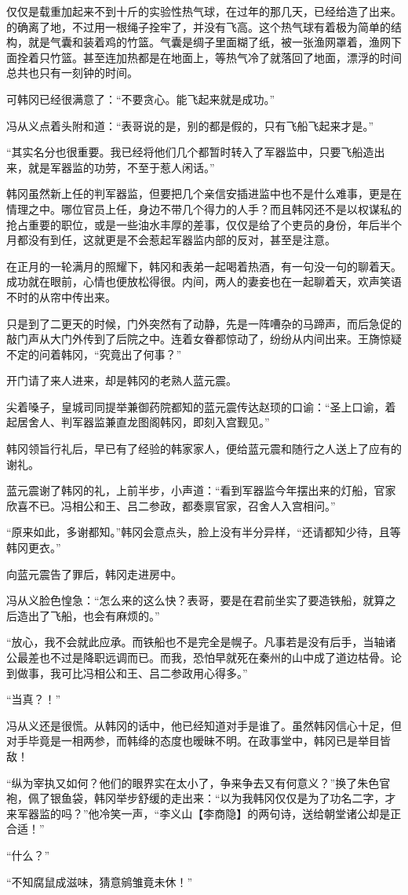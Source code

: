 仅仅是载重加起来不到十斤的实验性热气球，在过年的那几天，已经给造了出来。的确离了地，不过用一根绳子拴牢了，并没有飞高。这个热气球有着极为简单的结构，就是气囊和装着鸡的竹篮。气囊是绸子里面糊了纸，被一张渔网罩着，渔网下面拴着只竹篮。甚至连加热都是在地面上，等热气冷了就落回了地面，漂浮的时间总共也只有一刻钟的时间。

可韩冈已经很满意了：“不要贪心。能飞起来就是成功。”

冯从义点着头附和道：“表哥说的是，别的都是假的，只有飞船飞起来才是。”

“其实名分也很重要。我已经将他们几个都暂时转入了军器监中，只要飞船造出来，就是军器监的功劳，不至于惹人闲话。”

韩冈虽然新上任的判军器监，但要把几个亲信安插进监中也不是什么难事，更是在情理之中。哪位官员上任，身边不带几个得力的人手？而且韩冈还不是以权谋私的抢占重要的职位，或是一些油水丰厚的差事，仅仅是给了个吏员的身份，年后半个月都没有到任，这就更是不会惹起军器监内部的反对，甚至是注意。

在正月的一轮满月的照耀下，韩冈和表弟一起喝着热酒，有一句没一句的聊着天。成功就在眼前，心情也便放松得很。内间，两人的妻妾也在一起聊着天，欢声笑语不时的从帘中传出来。

只是到了二更天的时候，门外突然有了动静，先是一阵嘈杂的马蹄声，而后急促的敲门声从大门外传到了后院之中。连着女眷都惊动了，纷纷从内间出来。王旖惊疑不定的问着韩冈，“究竟出了何事？”

开门请了来人进来，却是韩冈的老熟人蓝元震。

尖着嗓子，皇城司同提举兼御药院都知的蓝元震传达赵顼的口谕：“圣上口谕，着起居舍人、判军器监兼直龙图阁韩冈，即刻入宫觐见。”

韩冈领旨行礼后，早已有了经验的韩家家人，便给蓝元震和随行之人送上了应有的谢礼。

蓝元震谢了韩冈的礼，上前半步，小声道：“看到军器监今年摆出来的灯船，官家欣喜不已。冯相公和王、吕二参政，都奏禀官家，召舍人入宫相问。”

“原来如此，多谢都知。”韩冈会意点头，脸上没有半分异样，“还请都知少待，且等韩冈更衣。”

向蓝元震告了罪后，韩冈走进房中。

冯从义脸色惶急：“怎么来的这么快？表哥，要是在君前坐实了要造铁船，就算之后造出了飞船，也会有麻烦的。”

“放心，我不会就此应承。而铁船也不是完全是幌子。凡事若是没有后手，当轴诸公最差也不过是降职远调而已。而我，恐怕早就死在秦州的山中成了道边枯骨。论到做事，我可比冯相公和王、吕二参政用心得多。”

“当真？！”

冯从义还是很慌。从韩冈的话中，他已经知道对手是谁了。虽然韩冈信心十足，但对手毕竟是一相两参，而韩绛的态度也暧昧不明。在政事堂中，韩冈已是举目皆敌！

“纵为宰执又如何？他们的眼界实在太小了，争来争去又有何意义？”换了朱色官袍，佩了银鱼袋，韩冈举步舒缓的走出来：“以为我韩冈仅仅是为了功名二字，才来军器监的吗？”他冷笑一声，“李义山【李商隐】的两句诗，送给朝堂诸公却是正合适！”

“什么？”

“不知腐鼠成滋味，猜意鹓雏竟未休！”

